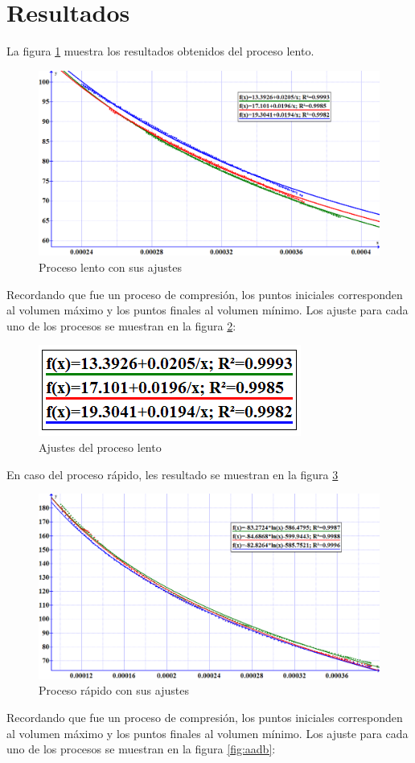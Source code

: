 \documentclass[12pt]{article}
\begin{document}
\section{Resultados}
La figura \ref{fig:Iso} muestra los resultados obtenidos del proceso lento.
\begin{figure}[H]
\centering
\includegraphics[width=0.75\linewidth]{Isoter.png}
\caption{Proceso lento con sus ajustes}
\label{fig:Iso}
\end{figure}
Recordando que fue un proceso de compresión, los puntos iniciales corresponden al volumen máximo y los puntos finales al volumen mínimo. Los ajuste para cada uno de los procesos se muestran en la figura \ref{fig:aIso}:
\begin{figure}[H]
\centering
\includegraphics[width=0.35\linewidth]{AIsoter.png}
\caption{Ajustes del proceso lento}
\label{fig:aIso}
\end{figure}
\pagebreak
En caso del proceso rápido, les resultado se muestran en la figura \ref{fig:adb} 
\begin{figure}[H]
\centering
\includegraphics[width=0.75\linewidth]{Adiab.png}
\caption{Proceso rápido con sus ajustes}
\label{fig:adb}
\end{figure}
Recordando que fue un proceso de compresión, los puntos iniciales corresponden al volumen máximo y los puntos finales al volumen mínimo. Los ajuste para cada uno de los procesos se muestran en la figura \ref{fig:aadb}:
\end{document}
